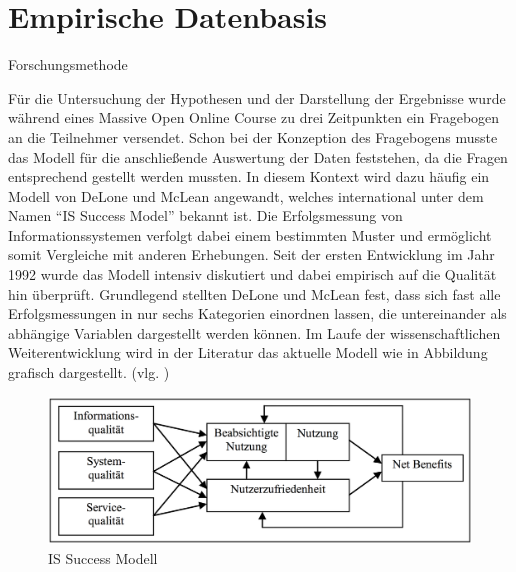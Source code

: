 \section{Empirische Datenbasis}
\label{sec:emp_daten}

Forschungsmethode

Für die Untersuchung der Hypothesen und der Darstellung der Ergebnisse wurde während eines Massive Open Online Course zu drei Zeitpunkten ein Fragebogen an die Teilnehmer versendet. Schon bei der Konzeption des Fragebogens musste das Modell für die anschließende Auswertung der Daten feststehen, da die Fragen entsprechend gestellt werden mussten. In diesem Kontext wird dazu häufig ein Modell von DeLone und McLean angewandt, welches international unter dem Namen "`IS Success Model"' bekannt ist. Die Erfolgsmessung von Informationssystemen verfolgt dabei einem bestimmten Muster und ermöglicht somit Vergleiche mit anderen Erhebungen. Seit der ersten Entwicklung im Jahr 1992 wurde das Modell intensiv diskutiert und dabei empirisch auf die Qualität hin überprüft. Grundlegend stellten DeLone und McLean fest, dass sich fast alle Erfolgsmessungen in nur sechs Kategorien einordnen lassen, die untereinander als abhängige Variablen dargestellt werden können. Im Laufe der wissenschaftlichen Weiterentwicklung wird in der Literatur das aktuelle Modell wie in Abbildung grafisch dargestellt. (vlg. \cite{delone2002information})

\begin{figure}[h]
\centering
\includegraphics[width=1\textwidth]{Grafiken/issuccess.png}
\caption{IS Success Modell}
\label{IS Success Model}
\end{figure}



\label{tab:Forschungsmodell} 

